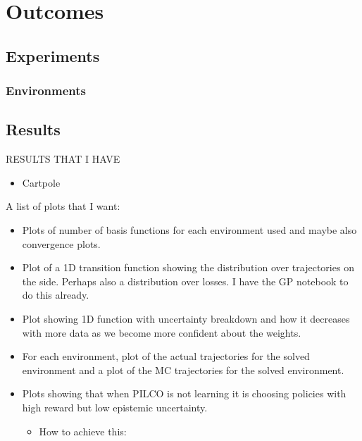 \chapter{Outcomes}

\ifpdf
    \graphicspath{{Chapter3/Figs/Raster/}{Chapter3/Figs/PDF/}{Chapter3/Figs/}}
\else
    \graphicspath{{Chapter3/Figs/Vector/}{Chapter3/Figs/}}
\fi

\section{Experiments}
\subsection{Environments}

\section{Results}
RESULTS THAT I HAVE
\begin{itemize}
    \item Cartpole
\end{itemize}

A list of plots that I want:

\begin{itemize}
    \item Plots of number of basis functions for each environment used and maybe also convergence plots.
    \item Plot of a 1D transition function showing the distribution over trajectories on the side. Perhaps also a distribution over losses. I have the GP notebook to do this already.
    \item Plot showing 1D function with uncertainty breakdown and how it decreases with more data as we become more confident about the weights.
    \item For each environment, plot of the actual trajectories for the solved environment and a plot of the MC trajectories for the solved environment.
    \item Plots showing that when PILCO is not learning it is choosing policies with high reward but low epistemic uncertainty.
    \begin{itemize}
        \item How to achieve this: 
    \end{itemize}    
\end{itemize}


